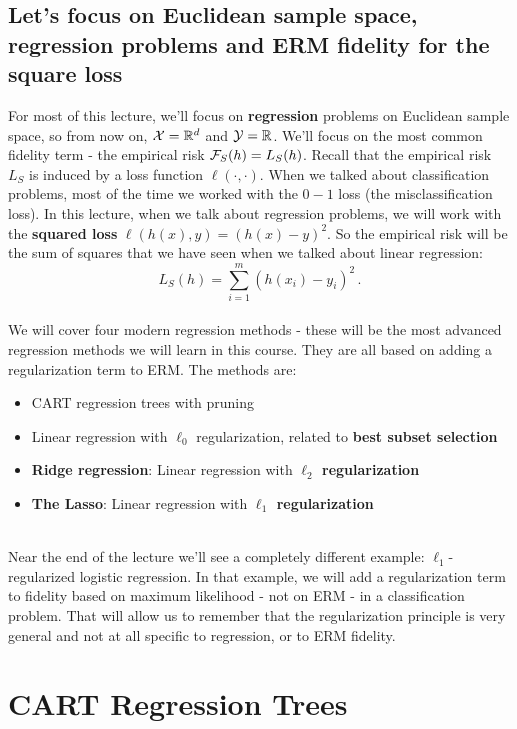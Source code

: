     \subsection{Let's focus on Euclidean sample space, regression problems and
    ERM fidelity for the square loss}

    For most of this lecture, we'll focus on {\bf regression} problems on
    Euclidean sample space, so from now on, $\mathcal{X}=\mathbb{R}^d$ and
    $\mathcal{Y}=\mathbb{R}$. We'll focus on the most common fidelity term - the empirical risk
    $\mathcal{F}_S(h) = L_S(h)$. 
    Recall that the empirical risk $L_S$ is induced by a loss function
    $\ell(\cdot,\cdot)$. 
    When we talked about classification problems, most of the time we worked
    with the $0-1$ loss (the misclassification loss). In this lecture, when we
    talk about regression problems, we will work with the {\bf squared loss}
    $\ell(h(x),y)=(h(x)-y)^2$. So the empirical risk will be the sum of squares
    that we have seen when we talked about linear regression:
    \[
      L_S(h)= \sum_{i=1}^m \left( h(x_i)-y_i \right)^2\,.
    \]
~\\
    We will cover four modern regression methods - these will be the most advanced
    regression methods we will learn in this course. They are all based on
    adding a regularization term to ERM. The methods are:

    \begin{itemize}
  \item CART regression trees with pruning
  \item Linear regression with $\ell_0$ regularization, related to {\bf best subset selection}
  \item {\bf Ridge regression}: Linear regression with {\bf $\ell_2$ regularization}
  \item {\bf The Lasso}: Linear regression with {\bf $\ell_1$ regularization}
 \end{itemize}
~\\
    Near the end of the lecture we'll see a completely different example:
    $\ell_1$-regularized logistic regression. In that example, we will
    add a regularization term to fidelity based on  maximum likelihood  - not
    on ERM - in a classification problem. That will allow us to remember that
    the regularization principle is very general and not at all specific to
    regression, or to ERM fidelity. 

    \section{CART Regression Trees}

